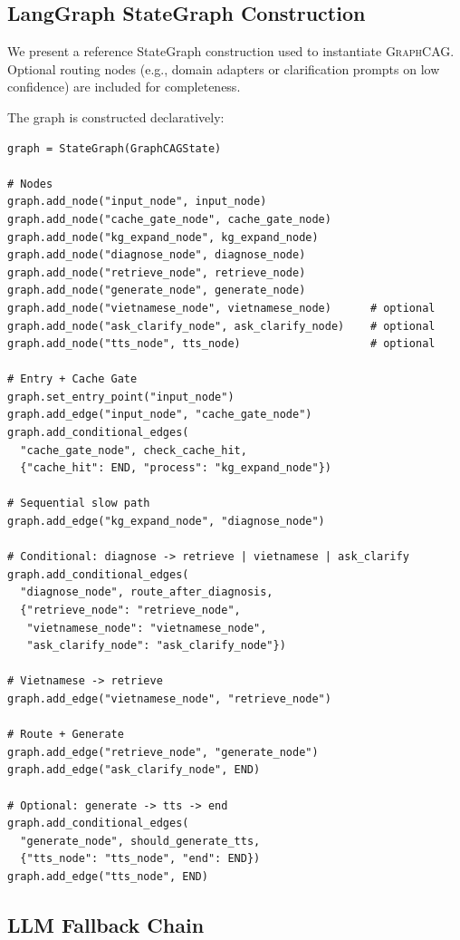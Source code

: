 \documentclass[11pt,a4paper,twocolumn]{article}
\newcommand{\graphcag}{\textsc{GraphCAG}}
\begin{document}
\subsection{LangGraph StateGraph Construction}

We present a reference StateGraph construction used to instantiate \graphcag{}. Optional routing nodes (e.g., domain adapters or clarification prompts on low confidence) are included for completeness.

The graph is constructed declaratively:

\begin{lstlisting}[caption={StateGraph construction in Python.},label={lst:graph}]
graph = StateGraph(GraphCAGState)

# Nodes
graph.add_node("input_node", input_node)
graph.add_node("cache_gate_node", cache_gate_node)
graph.add_node("kg_expand_node", kg_expand_node)
graph.add_node("diagnose_node", diagnose_node)
graph.add_node("retrieve_node", retrieve_node)
graph.add_node("generate_node", generate_node)
graph.add_node("vietnamese_node", vietnamese_node)      # optional
graph.add_node("ask_clarify_node", ask_clarify_node)    # optional
graph.add_node("tts_node", tts_node)                    # optional

# Entry + Cache Gate
graph.set_entry_point("input_node")
graph.add_edge("input_node", "cache_gate_node")
graph.add_conditional_edges(
  "cache_gate_node", check_cache_hit,
  {"cache_hit": END, "process": "kg_expand_node"})

# Sequential slow path
graph.add_edge("kg_expand_node", "diagnose_node")

# Conditional: diagnose -> retrieve | vietnamese | ask_clarify
graph.add_conditional_edges(
  "diagnose_node", route_after_diagnosis,
  {"retrieve_node": "retrieve_node",
   "vietnamese_node": "vietnamese_node",
   "ask_clarify_node": "ask_clarify_node"})

# Vietnamese -> retrieve
graph.add_edge("vietnamese_node", "retrieve_node")

# Route + Generate
graph.add_edge("retrieve_node", "generate_node")
graph.add_edge("ask_clarify_node", END)

# Optional: generate -> tts -> end
graph.add_conditional_edges(
  "generate_node", should_generate_tts,
  {"tts_node": "tts_node", "end": END})
graph.add_edge("tts_node", END)
\end{lstlisting}

\subsection{LLM Fallback Chain}
\end{document}

